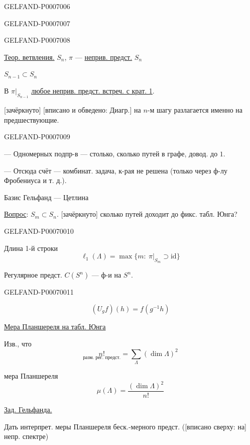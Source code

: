 \begin{GelfandAdjacentEvidence}{GELFAND-P000700}{6}

\end{GelfandAdjacentEvidence}
\begin{GelfandAdjacentEvidence}{GELFAND-P000700}{7}

\end{GelfandAdjacentEvidence}
\begin{GelfandAdjacentEvidence}{GELFAND-P000700}{8}


\underline{Теор. ветвления.}\qquad
\(S_n\), \(\pi\) --- \underline{неприв. предст.} \(S_n\)

\(S_{n-1}\subset S_n\)

В \(\pi|_{S_{n-1}}\) \underline{любое неприв. предст. встреч. с крат. 1}.

[зачёркнуто] [вписано и обведено: Диагр.] на \(n\)-м шагу разлагается именно на предшествующие.
\end{GelfandAdjacentEvidence}
\begin{GelfandAdjacentEvidence}{GELFAND-P000700}{9}


--- Одномерных подпр-в --- столько, сколько путей в графе, довод. до \(1\).

--- Отсюда счёт --- комбинат. задача, к-рая не решена (только через ф-лу Фробениуса и т. д.).

Базис Гельфанд --- Цетлина

\underline{Вопрос}: \(S_m\subset S_n\). [зачёркнуто] сколько путей доходит до фикс. табл. Юнга?
\end{GelfandAdjacentEvidence}
\begin{GelfandAdjacentEvidence}{GELFAND-P000700}{10}


Длина 1-й строки
\[
\ell_1(\Lambda)=\max\{m:\ \pi|_{S_m}\supset\mathrm{id}\}
\]

Регулярное предст. \(C(S^n)\) --- ф-и на \(S^n\).
\end{GelfandAdjacentEvidence}
\begin{GelfandAdjacentEvidence}{GELFAND-P000700}{11}

\[
(U_g f)(h)=f(g^{-1}h)
\]

\underline{Мера Планшереля на табл. Юнга}

Изв., что
\[
\underset{\text{разм. рег. предст.}}{n!}=\sum_\Lambda(\dim\Lambda)^2
\]

мера Планшереля
\[
\mu(\Lambda)=\frac{(\dim\Lambda)^2}{n!}
\]

\underline{Зад. Гельфанда.}

Дать интерпрет. меры Планшереля беск.-мерного предст. ([вписано сверху: на] непр. спектре)
\end{GelfandAdjacentEvidence}
